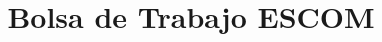 \documentclass[11pt, twopages]{book}
\date{}
\title{Bolsa de Trabajo ESCOM}
\author{}
\begin{document}
    \frontmatter
        \maketitle
        \tableofcontents
        \listoffigures
        \listoftables
    \mainmatter
    


    

    
    
    
        
    \appendix

        

    \medskip

    \printbibliography
\end{document}
